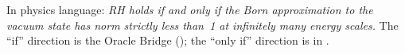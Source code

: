 In physics language: \emph{RH holds if and only if the Born approximation
to the vacuum state has norm strictly less than~1 at infinitely many
energy scales.} The ``if'' direction is the Oracle Bridge
(); the ``only if'' direction
is  in
.








